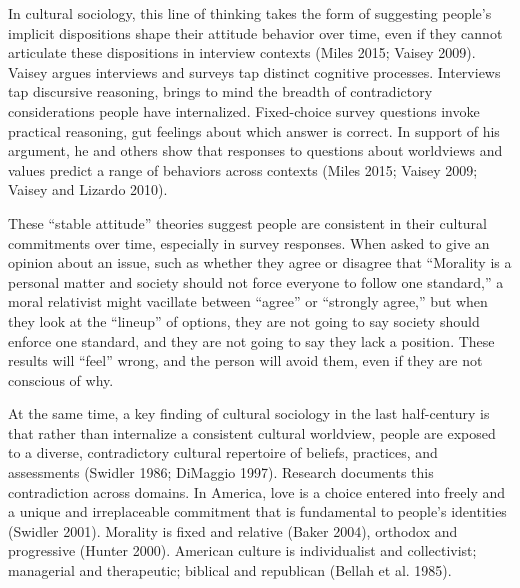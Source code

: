 \documentclass[12pt,]{article}
\begin{document}
In cultural sociology, this line of thinking takes the form of suggesting people's implicit dispositions shape their attitude behavior over time, even if they cannot articulate these dispositions in interview contexts (Miles 2015; Vaisey 2009). Vaisey argues interviews and surveys tap distinct cognitive processes. Interviews tap discursive reasoning, brings to mind the breadth of contradictory considerations people have internalized. Fixed-choice survey questions invoke practical reasoning, gut feelings about which answer is correct. In support of his argument, he and others show that responses to questions about worldviews and values predict a range of behaviors across contexts (Miles 2015; Vaisey 2009; Vaisey and Lizardo 2010).

These ``stable attitude'' theories suggest people are consistent in their cultural commitments over time, especially in survey responses. When asked to give an opinion about an issue, such as whether they agree or disagree that ``Morality is a personal matter and society should not force everyone to follow one standard,'' a moral relativist might vacillate between ``agree'' or ``strongly agree,'' but when they look at the ``lineup'' of options, they are not going to say society should enforce one standard, and they are not going to say they lack a position. These results will ``feel'' wrong, and the person will avoid them, even if they are not conscious of why.

At the same time, a key finding of cultural sociology in the last half-century is that rather than internalize a consistent cultural worldview, people are exposed to a diverse, contradictory cultural repertoire of beliefs, practices, and assessments (Swidler 1986; DiMaggio 1997). Research documents this contradiction across domains. In America, love is a choice entered into freely and a unique and irreplaceable commitment that is fundamental to people's identities (Swidler 2001). Morality is fixed and relative (Baker 2004), orthodox and progressive (Hunter 2000). American culture is individualist and collectivist; managerial and therapeutic; biblical and republican (Bellah et al. 1985).
\end{document}

